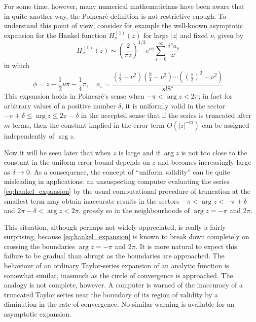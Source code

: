 \documentclass{article}
\begin{document}
For some time, however, many numerical mathematicians have been aware that in
quite another way, the Poincar{\'e} definition is not restrictive enough. To
understand this point of view, consider for example the well-known asymptotic
expansion for the Hankel function $H_{\nu}^{(1)} (z)$ for large $|z|$ and
fixed $\nu$, given by
\begin{equation}
  \label{eq:hankel_expansion} H_{\nu}^{(1)} (z) \sim \left( \frac{2}{\pi z}
  \right)^{1 / 2} e^{i \phi}  \sum_{s = 0}^{\infty} \frac{i^s a_s}{z^s}
\end{equation}
in which
\begin{equation}
  \label{eq:hankel_coefficients} \phi = z - \frac{1}{2} \nu \pi - \frac{1}{4}
  \pi, \quad a_s = \frac{(\frac{1}{2} - \nu^2)  (\frac{9}{4} - \nu^2) \cdots
  ((\frac{s}{2})^2 - \nu^2)}{s! 8^s}
\end{equation}
This expansion holds in Poincar{\'e}'s sense {\cite{poincare_sense}} when $-
\pi < \arg z < 2 \pi$; in fact for arbitrary values of a positive number
$\delta$, it is uniformly valid in the sector $- \pi + \delta \leq \arg z \leq
2 \pi - \delta$ in the accepted sense that if the series is truncated after
$m$ terms, then the constant implied in the error term $O (|z|^{- m})$ can be
assigned independently of $\arg z$.

Now it will be seen later {\cite{later_reference}} that when $z$ is large and
if $\arg z$ is not too close to the constant in the uniform error bound
depends on $z$ and becomes increasingly large as $\delta \to 0$. As a
consequence, the concept of ``uniform validity'' can be quite misleading in
applications: an unsuspecting computer evaluating the series
\eqref{eq:hankel_expansion} by the usual computational procedure of truncation
at the smallest term may obtain inaccurate results in the sectors $- \pi <
\arg z < - \pi + \delta$ and $2 \pi - \delta < \arg z < 2 \pi$, grossly so in
the neighbourhoods of $\arg z = - \pi$ and $2 \pi$.

This situation, although perhaps not widely appreciated, is really a fairly
surprising, because \eqref{eq:hankel_expansion} is known to break down
completely on crossing the boundaries $\arg z = - \pi$ and $2 \pi$. It is more
natural {\cite{natural_reference}} to expect this failure to be gradual than
abrupt as the boundaries are approached. The behaviour of an ordinary
Taylor-series expansion of an analytic function is somewhat similar, inasmuch
as the circle of convergence is approached. The analogy is not complete,
however. A computer is warned of the inaccuracy of a truncated Taylor series
near the boundary of its region of validity by a diminution in the rate of
convergence. No similar warning is available for an asymptotic expansion.
\end{document}
